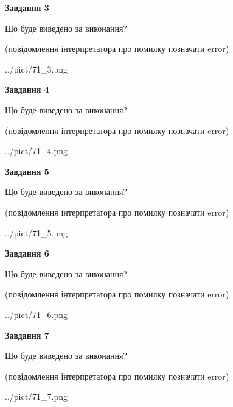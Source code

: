 \documentclass[12pt, ukrainian]{article}
\begin{document}
{\begin {large}
{\begin {center}\textbf{Завдання 3}\end {center}}\par
Що буде виведено за виконання?\par
 (повідомлення інтерпретатора про помилку позначати error)\par
\begin{center}
	{../pict/71_3.png}
\end{center}
\newpage

{\begin {center}\textbf{Завдання 4}\end {center}}\par
Що буде виведено за виконання?\par
 (повідомлення інтерпретатора про помилку позначати error)\par
\begin{center}
	{../pict/71_4.png}
\end{center}
\newpage

{\begin {center}\textbf{Завдання 5}\end {center}}\par
Що буде виведено за виконання?\par
 (повідомлення інтерпретатора про помилку позначати error)\par
\begin{center}
	{../pict/71_5.png}
\end{center}
\newpage

{\begin {center}\textbf{Завдання 6}\end {center}}\par
Що буде виведено за виконання?\par
 (повідомлення інтерпретатора про помилку позначати error)\par
\begin{center}
	{../pict/71_6.png}
\end{center}
\newpage

{\begin {center}\textbf{Завдання 7}\end {center}}\par
Що буде виведено за виконання?\par
 (повідомлення інтерпретатора про помилку позначати error)\par
\begin{center}
	{../pict/71_7.png}
\end{center}
\newpage


\end{large}}
\end{document}

